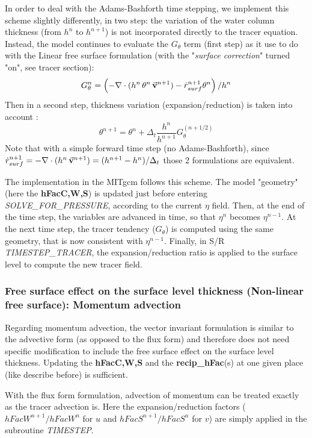In order to deal with the Adams-Bashforth time stepping,
we implement this scheme slightly differently, in two step:
the variation of the water column thickness (from
$h^n$ to $h^{n+1}$)
is not incorporated directly to the tracer equation.
Instead,
the model continues to evaluate the $G_\theta$ term (first step)
as it use to do with the Linear free surface formulation
(with the "{\it surface correction}" turned "on", see tracer section):
$$
G_\theta^n = \left(- \nabla \cdot (h^n \, \theta^n \, \vec{\bf v}^{n+1}) 
         - \dot{r}_{surf}^{n+1} \theta^n \right) / h^n
$$
Then in a second step,
thickness variation (expansion/reduction) is taken into account :
$$
\theta^{n+1} = \theta^n + \Delta_t \frac{h^n}{h^{n+1}} G_\theta^{(n+1/2)} 
$$
Note that with a simple forward time step (no Adams-Bashforth), 
since
$
\dot{r}_{surf}^{n+1} 
= - \nabla \cdot (h^n \, \vec{\bf v}^{n+1} ) = (h^{n+1} - h^{n})
/ \Delta_t
$
those 2 formulations are equivalent. 

The implementation in the MITgcm follows this scheme.
The model "geometry" (here the {\bf hFacC,W,S}) is updated
just before entering {\it SOLVE\_FOR\_PRESSURE},
according to the current $\eta$ field.
Then, at the end of the time step, the variables are
advanced in time, so that $\eta^n$ becomes $\eta^{n-1}$.
At the next time step, the tracer tendency ($G_\theta$) is computed 
using the same geometry, that is now consistent with
$\eta^{n-1}$.
Finally, in S/R {\it TIMESTEP\_TRACER}, the expansion/reduction
ratio is applied to the surface level to compute the new tracer field.

\subsubsection{Free surface effect on the surface level thickness
(Non-linear free surface): Momentum advection}     

Regarding momentum advection,
the vector invariant formulation is similar to the
advective form (as opposed to the flux form) and therefore
does not need specific modification to include the 
free surface effect on the surface level thickness.
Updating the {\bf hFacC,W,S} and the {\bf recip\_hFac}(s) 
at one given place (like describe before) is sufficient.

With the flux form formulation, advection of momentum
can be treated exactly as the tracer advection is.
Here the expansion/reduction factors ($hFacW^{n+1}/hFacW^n$ for $u$
and $hFacS^{n+1}/hFacS^n$ for $v$) are simply applied in the
subroutine {\it TIMESTEP}.

